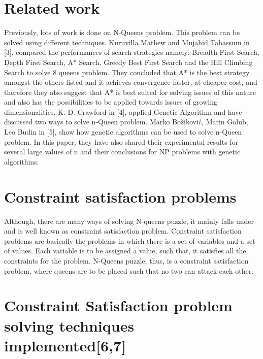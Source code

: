 \documentclass[conference]{IEEEtran}
\begin{document}
 




\section{Related work}
Previously,  lots  of  work  is  done  on  N-Queens  problem. This problem can be solved using different techniques. Kuruvilla Mathew and Mujahid Tabassum in [3], compared the performances of search strategies namely: Breadth  First  Search,  Depth First Search, A* Search, Greedy Best First Search and the  Hill  Climbing  Search to solve 8 queens problem. They concluded that A* is the best strategy amongst the others listed and it achieves convergence faster, at cheaper cost, and therefore they also suggest that A* is  best  suited  for  solving  issues  of  this  nature and also  has  the possibilities  to  be  applied  towards  issues  of  growing dimensionalities.	 K.  D. Crawford  in  [4],  applied  Genetic  Algorithm  and  have discussed  two  ways  to  solve  n-Queen  problem. Marko Božiković, Marin Golub, Leo Budin in [5], show how genetic  algorithms can  be  used  to  solve  n-Queen  problem. In this paper, they have also shared their experimental results for several large values of n and their conclusions for NP problems with genetic algorithms.

\section{Constraint satisfaction problems}

Although, there are many ways of solving N-queens puzzle, it mainly falls under and is well known as  constraint satisfaction  problem. Constraint satisfaction problems are basically the problems in which there is a set of variables and a set of values. Each variable is to be assigned a value, such that, it satisfies all the constraints for the problem. N-Queens puzzle, thus, is a constraint satisfaction problem, where queens are to be placed such that no two can attack each other.

\section{Constraint Satisfaction problem solving techniques implemented[6,7]}
\end{document}
